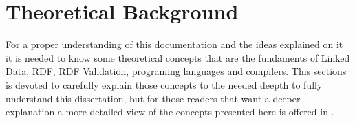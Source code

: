 \setchapterpreamble[u]{\margintoc}
\chapter{Theoretical Background}

For a proper understanding of this documentation and the ideas explained on it it is needed to know some theoretical concepts that are the fundaments of Linked Data, RDF, RDF Validation, programing languages and compilers. This sections is devoted to carefully explain those concepts to the needed deepth to fully understand this dissertation, but for those readers that want a deeper explanation a more detailed view of the concepts presented here is offered in .








